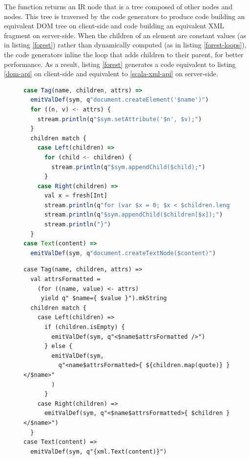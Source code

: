\documentclass[preprint]{sigplanconf}
\begin{document}
The  function returns an  IR node that is a tree composed of other
 nodes and  nodes. This tree is traversed by the code generators to produce
code building an equivalent DOM tree on client-side and code building an equivalent XML fragment on
server-side. When the children of an element are constant values (as in listing \ref{forest}) rather
than dynamically computed (as in listing \ref{forest-loops}), the code generators inline the loop
that adds children to their parent, for better performance. As a result, listing \ref{forest}
generates a code equivalent to listing \ref{dom-api} on client-side and equivalent to
\ref{scala-xml-api} on server-side.

\begin{figure}
\begin{lstlisting}[language=JavaScript,label=js-gen-forest,caption=JavaScript code generator for the
DOM fragment
definition DSL]
case Tag(name, children, attrs) =>
  emitValDef(sym, q"document.createElement('$name')")
  for ((n, v) <- attrs) {
    stream.println(q"$sym.setAttribute('$n', $v);")
  }
  children match {
    case Left(children) =>
      for (child <- children) {
        stream.println(q"$sym.appendChild($child);")
      }
    case Right(children) =>
      val x = fresh[Int]
      stream.println(q"for (var $x = 0; $x < $children.length; $x++) {")
      stream.println(q"$sym.appendChild($children[$x]);")
      stream.println("}")
  }
case Text(content) =>
  emitValDef(sym, q"document.createTextNode($content)")
\end{lstlisting}
\end{figure}

\begin{figure}
\begin{lstlisting}[label=scala-gen-forest,caption=Scala code generator for the DOM fragment
definition DSL]
case Tag(name, children, attrs) =>
  val attrsFormatted =
    (for ((name, value) <- attrs)
     yield q" $name={ $value }").mkString
  children match {
    case Left(children) =>
      if (children.isEmpty) {
        emitValDef(sym, q"<$name$attrsFormatted />")
      } else {
        emitValDef(sym,
          q"<name$attrsFormatted>{ ${children.map(quote)} }</$name>"
        )
      }
    case Right(children) =>
      emitValDef(sym, q"<$name$attrsFormatted>{ $children }</$name>")
  }
case Text(content) =>
  emitValDef(sym, q"{xml.Text(content)}")
\end{lstlisting}
\end{figure}
\end{document}
